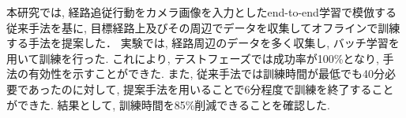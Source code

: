 
本研究では, 経路追従行動をカメラ画像を入力としたend-to-end学習で模倣する従来手法を基に, 目標経路上及びその周辺でデータを収集してオフラインで訓練する手法を提案した． 実験では, 経路周辺のデータを多く収集し, バッチ学習を用いて訓練を行った. これにより, テストフェーズでは成功率が100\%となり, 手法の有効性を示すことができた. また, 従来手法では訓練時間が最低でも40分必要であったのに対して, 提案手法を用いることで6分程度で訓練を終了することができた. 結果として, 訓練時間を85\%削減できることを確認した.  